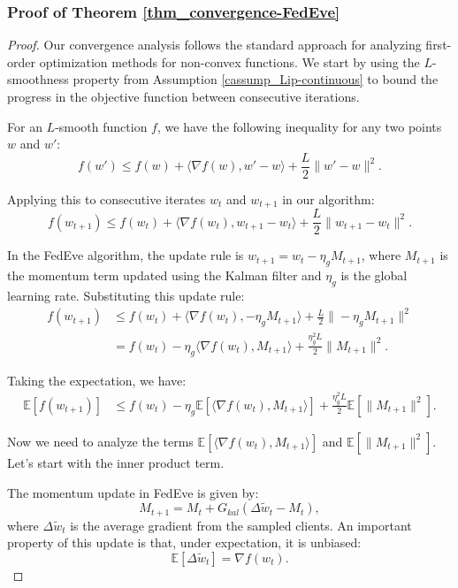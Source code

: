 \subsubsection{Proof of Theorem \ref{thm_convergence-FedEve}}
\begin{proof}
    Our convergence analysis follows the standard approach for analyzing first-order optimization methods for non-convex functions. We start by using the \(L\)-smoothness property from Assumption \ref{cassump_Lip-continuous} to bound the progress in the objective function between consecutive iterations.
    
    For an \(L\)-smooth function \(f\), we have the following inequality for any two points \(w\) and \(w'\):
    \[
        f(w') \leq f(w) + \langle \nabla f(w), w' - w \rangle + \frac{L}{2} \|w' - w\|^2.
    \]
    
    Applying this to consecutive iterates \(w_t\) and \(w_{t+1}\) in our algorithm:
    \[
        f(w_{t+1}) \leq f(w_t) + \langle \nabla f(w_t), w_{t+1} - w_t \rangle + \frac{L}{2} \|w_{t+1} - w_t\|^2.
    \]
    
    In the FedEve algorithm, the update rule is \(w_{t+1} = w_t - \eta_g M_{t+1}\), where \(M_{t+1}\) is the momentum term updated using the Kalman filter and \(\eta_g\) is the global learning rate. Substituting this update rule:
    \begin{align*}
        f(w_{t+1}) &\leq f(w_t) + \langle \nabla f(w_t), -\eta_g M_{t+1} \rangle + \frac{L}{2} \|-\eta_g M_{t+1}\|^2 \\
        &= f(w_t) - \eta_g \langle \nabla f(w_t), M_{t+1} \rangle + \frac{\eta_g^2 L}{2} \|M_{t+1}\|^2.
    \end{align*}
    
    Taking the expectation, we have:
    \begin{align*}
        \mathbb{E}[f(w_{t+1})] &\leq f(w_t) - \eta_g \mathbb{E}[\langle \nabla f(w_t), M_{t+1} \rangle] + \frac{\eta_g^2 L}{2} \mathbb{E}[\|M_{t+1}\|^2].
    \end{align*}
    
    Now we need to analyze the terms \(\mathbb{E}[\langle \nabla f(w_t), M_{t+1} \rangle]\) and \(\mathbb{E}[\|M_{t+1}\|^2]\). Let's start with the inner product term.
    
    The momentum update in FedEve is given by:
    \[
        M_{t+1} = M_t + G_{kal}(\Delta \tilde{w}_t - M_t),
    \]
    where \(\Delta \tilde{w}_t\) is the average gradient from the sampled clients. An important property of this update is that, under expectation, it is unbiased:
    \[
        \mathbb{E}[\Delta \tilde{w}_t] = \nabla f(w_t).
    \]
    

\end{proof}
